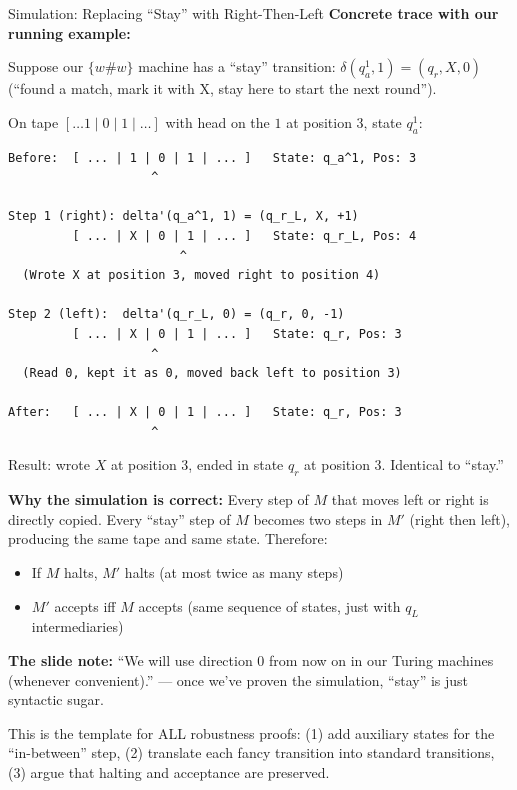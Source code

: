 \documentclass[11pt,a4paper]{article}
\newcommand{\kt}[1]{\par\vspace{0.3em}\colorbox{yellow!60}{\parbox{\dimexpr\linewidth-2\fboxsep}{#1}}\vspace{0.3em}}
\begin{document}
\begin{examplebox}{{Simulation: Replacing ``Stay'' with Right-Then-Left}}
\textbf{Concrete trace with our running example:}

Suppose our $\{w\#w\}$ machine has a ``stay'' transition: $\delta(q_a^1, 1) = (q_r, X, 0)$ (``found a match, mark it with X, stay here to start the next round'').

On tape $[\ldots 1 \mid 0 \mid 1 \mid \ldots]$ with head on the $1$ at position 3, state $q_a^1$:

\begin{lstlisting}
Before:  [ ... | 1 | 0 | 1 | ... ]   State: q_a^1, Pos: 3
                    ^

Step 1 (right): delta'(q_a^1, 1) = (q_r_L, X, +1)
         [ ... | X | 0 | 1 | ... ]   State: q_r_L, Pos: 4
                        ^
  (Wrote X at position 3, moved right to position 4)

Step 2 (left):  delta'(q_r_L, 0) = (q_r, 0, -1)
         [ ... | X | 0 | 1 | ... ]   State: q_r, Pos: 3
                    ^
  (Read 0, kept it as 0, moved back left to position 3)

After:   [ ... | X | 0 | 1 | ... ]   State: q_r, Pos: 3
                    ^
\end{lstlisting}

Result: wrote $X$ at position 3, ended in state $q_r$ at position 3. Identical to ``stay.''

\textbf{Why the simulation is correct:} Every step of $M$ that moves left or right is directly copied. Every ``stay'' step of $M$ becomes two steps in $M'$ (right then left), producing the same tape and same state. Therefore:
\begin{itemize}[nosep]
\item If $M$ halts, $M'$ halts (at most twice as many steps)
\item $M'$ accepts iff $M$ accepts (same sequence of states, just with $q_L$ intermediaries)
\end{itemize}

\textbf{The slide note:} ``We will use direction 0 from now on in our Turing machines (whenever convenient).'' --- once we've proven the simulation, ``stay'' is just syntactic sugar.

\kt{This is the template for ALL robustness proofs: (1) add auxiliary states for the ``in-between'' step, (2) translate each fancy transition into standard transitions, (3) argue that halting and acceptance are preserved.}
\end{examplebox}


\newpage
\end{document}
